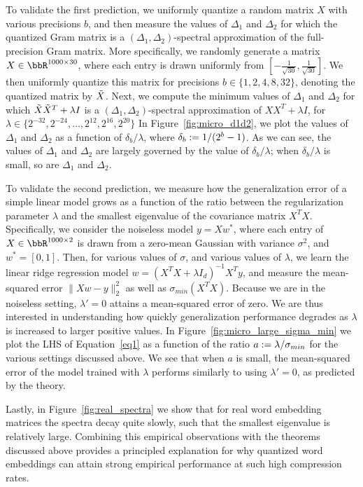 To validate the first prediction, we uniformly quantize a random matrix $X$ with various precisions $b$, and then measure the values of $\Delta_1$ and $\Delta_2$ for which the quantized Gram matrix is a $(\Delta_1,\Delta_2)$-spectral approximation of the full-precision Gram matrix.
More specifically, we randomly generate a matrix $X \in \RR^{1000 \times 30}$, where each entry is drawn uniformly from $[-\frac{1}{\sqrt{30}},\frac{1}{\sqrt{30}}]$.
We then uniformly quantize this matrix for precisions $b \in \{1,2,4,8,32\}$, denoting the quantized matrix by $\tX$.
Next, we compute the minimum values of $\Delta_1$ and $\Delta_2$ for which $\tX\tX^T + \lambda I$ is a $(\Delta_1,\Delta_2)$-spectral approximation of $XX^T + \lambda I$, for $\lambda \in \{2^{-32}, 2^{-24}, \ldots, 2^{12}, 2^{16}, 2^{20}\}$ 
In Figure~\ref{fig:micro_d1d2}, we plot the values of $\Delta_1$ and $\Delta_2$ as a function of $\delta_b/\lambda$, where $\delta_b \defeq 1/(2^b-1)$.
As we can see, the values of $\Delta_1$ and $\Delta_2$ are largely governed by the value of $\delta_b/\lambda$; when $\delta_b/\lambda$ is small, so are $\Delta_1$ and $\Delta_2$.

To validate the second prediction, we measure how the generalization error of a simple linear model grows as a function of the ratio between the regularization parameter $\lambda$ and the smallest eigenvalue of the covariance matrix $X^T X$.
Specifically, we consider the noiseless model $y = Xw^*$, where each entry of $X \in \RR^{1000 \times 2}$ is drawn from a zero-mean Gaussian with variance $\sigma^2$, and $w^*=[0,1]$.
Then, for various values of $\sigma$, and various values of $\lambda$, we learn the linear ridge regression model $w = (X^T X + \lambda I_d)^{-1}X^Ty$, and measure the mean-squared error $\|Xw-y\|_2^2$ as well as $\sigma_{min}(X^T X)$.
Because we are in the noiseless setting, $\lambda'=0$ attains a mean-squared error of zero.
We are thus interested in understanding how quickly generalization performance degrades as $\lambda$ is increased to larger positive values.
In Figure~\ref{fig:micro_large_sigma_min} we plot the LHS of Equation~\eqref{eq1} as a function of the ratio $a \defeq \lambda/\sigma_{min}$ for the various settings discussed above.
We see that when $a$ is small, the mean-squared error of the model trained with $\lambda$ performs similarly to using $\lambda'=0$, as predicted by the theory.

Lastly, in Figure~\ref{fig:real_spectra} we show that for real word embedding matrices the spectra decay quite slowly, such that the smallest eigenvalue is relatively large.
Combining this empirical observations with the theorems discussed above provides a principled explanation for why quantized word embeddings can attain strong empirical performance at such high compression rates.

